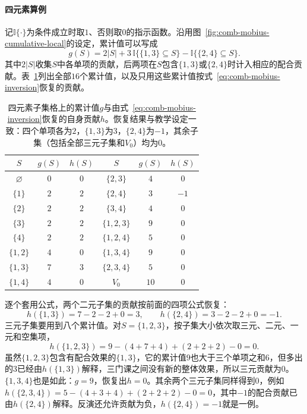 \paragraph{四元素算例}
记$\mathbb I\{\cdot\}$为条件成立时取$1$、否则取$0$的指示函数。沿用图~\ref{fig:comb-mobius-cumulative-local}的设定，累计值可以写成
\[
  g(S)=2|S|+3\,\mathbb I\{\{1,3\}\subseteq S\}-\mathbb I\{\{2,4\}\subseteq S\}.
\]
其中$2|S|$收集$S$中各单项的贡献，后两项在$S$包含$\{1,3\}$或$\{2,4\}$时计入相应的配合贡献。表~\ref{tab:comb-four-element-mobius}列出全部$16$个累计值，以及只用这些累计值按式~\eqref{eq:comb-mobius-inversion}恢复的贡献。

\begin{table}[!htb]
  \centering
  \begin{tabular}{ccc@{\qquad}ccc}
    \toprule
    $S$ & $g(S)$ & $h(S)$ & $S$ & $g(S)$ & $h(S)$ \\
    \midrule
    $\varnothing$ & $0$ & $0$ & $\{2,3\}$ & $4$ & $0$ \\
    $\{1\}$ & $2$ & $2$ & $\{2,4\}$ & $3$ & $-1$ \\
    $\{2\}$ & $2$ & $2$ & $\{3,4\}$ & $4$ & $0$ \\
    $\{3\}$ & $2$ & $2$ & $\{1,2,3\}$ & $9$ & $0$ \\
    $\{4\}$ & $2$ & $2$ & $\{1,2,4\}$ & $5$ & $0$ \\
    $\{1,2\}$ & $4$ & $0$ & $\{1,3,4\}$ & $9$ & $0$ \\
    $\{1,3\}$ & $7$ & $3$ & $\{2,3,4\}$ & $5$ & $0$ \\
    $\{1,4\}$ & $4$ & $0$ & $V_0$ & $10$ & $0$ \\
    \bottomrule
  \end{tabular}
  \caption{四元素子集格上的累计值$g$与由式~\eqref{eq:comb-mobius-inversion}恢复的自身贡献$h$。恢复结果与教学设定一致：四个单项各为$2$，$\{1,3\}$为$3$，$\{2,4\}$为$-1$，其余子集（包括全部三元子集和$V_0$）均为$0$。}
  \label{tab:comb-four-element-mobius}
\end{table}

逐个套用公式，两个二元子集的贡献按前面的四项公式恢复：
\[
  h(\{1,3\})=7-2-2+0=3,\qquad h(\{2,4\})=3-2-2+0=-1.
\]
三元子集要用到八个累计值。对$S=\{1,2,3\}$，按子集大小依次取三元、二元、一元和空集项，
\[
  h(\{1,2,3\})=9-(4+7+4)+(2+2+2)-0=0.
\]
虽然$\{1,2,3\}$包含有配合效果的$\{1,3\}$，它的累计值$9$也大于三个单项之和$6$，但多出的$3$已经由$h(\{1,3\})$解释，三门课之间没有新的整体效果，所以三元贡献为$0$。$\{1,3,4\}$也是如此：$g=9$，恢复出$h=0$。其余两个三元子集同样得到$0$，例如$h(\{2,3,4\})=5-(4+3+4)+(2+2+2)-0=0$，其中$-1$的配合贡献已由$h(\{2,4\})$解释。反演还允许贡献为负，$h(\{2,4\})=-1$就是一例。

